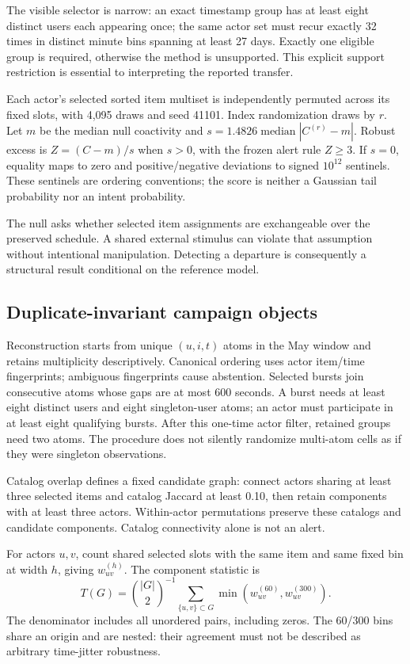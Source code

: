 \documentclass[sigconf,nonacm]{acmart}
\begin{document}
The visible selector is narrow: an exact timestamp group has at least eight distinct users each appearing once; the same actor set must recur exactly 32 times in distinct minute bins spanning at least 27 days. Exactly one eligible group is required, otherwise the method is unsupported. This explicit support restriction is essential to interpreting the reported transfer.

Each actor's selected sorted item multiset is independently permuted across its fixed slots, with 4,095 draws and seed 41101. Index randomization draws by $r$. Let $m$ be the median null coactivity and $s=1.4826\operatorname{median}|C^{(r)}-m|$. Robust excess is $Z=(C-m)/s$ when $s>0$, with the frozen alert rule $Z\geq3$. If $s=0$, equality maps to zero and positive/negative deviations to signed $10^{12}$ sentinels. These sentinels are ordering conventions; the score is neither a Gaussian tail probability nor an intent probability.

The null asks whether selected item assignments are exchangeable over the preserved schedule. A shared external stimulus can violate that assumption without intentional manipulation. Detecting a departure is consequently a structural result conditional on the reference model.

\subsection{Duplicate-invariant campaign objects}
Reconstruction starts from unique $(u,i,t)$ atoms in the May window and retains multiplicity descriptively. Canonical ordering uses actor item/time fingerprints; ambiguous fingerprints cause abstention. Selected bursts join consecutive atoms whose gaps are at most 600 seconds. A burst needs at least eight distinct users and eight singleton-user atoms; an actor must participate in at least eight qualifying bursts. After this one-time actor filter, retained groups need two atoms. The procedure does not silently randomize multi-atom cells as if they were singleton observations.

Catalog overlap defines a fixed candidate graph: connect actors sharing at least three selected items and catalog Jaccard at least 0.10, then retain components with at least three actors. Within-actor permutations preserve these catalogs and candidate components. Catalog connectivity alone is not an alert.

For actors $u,v$, count shared selected slots with the same item and same fixed bin at width $h$, giving $w_{uv}^{(h)}$. The component statistic is
\begin{equation}
T(G)=\binom{|G|}{2}^{-1}\sum_{\{u,v\}\subset G}\min(w_{uv}^{(60)},w_{uv}^{(300)}).
\end{equation}
The denominator includes all unordered pairs, including zeros. The 60/300 bins share an origin and are nested: their agreement must not be described as arbitrary time-jitter robustness.
\end{document}
